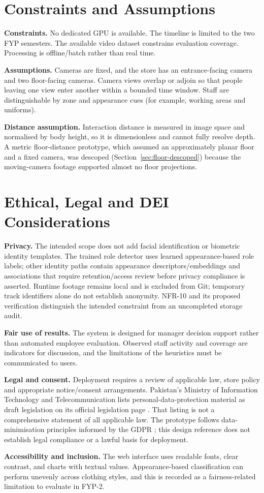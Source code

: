 \section{Constraints and Assumptions}
\textbf{Constraints.} No dedicated GPU is available. The timeline is limited to the two FYP semesters. The available video dataset constrains evaluation coverage. Processing is offline/batch rather than real time.

\textbf{Assumptions.} Cameras are fixed, and the store has an entrance-facing camera and two floor-facing cameras. Camera views overlap or adjoin so that people leaving one view enter another within a bounded time window. Staff are distinguishable by zone and appearance cues (for example, working areas and uniforms).

\textbf{Distance assumption.} Interaction distance is measured in image space and normalised by body height, so it is dimensionless and cannot fully resolve depth. A metric floor-distance prototype, which assumed an approximately planar floor and a fixed camera, was descoped (Section~\ref{sec:floor-descoped}) because the moving-camera footage supported almost no floor projections.

\section{Ethical, Legal and DEI Considerations}
\textbf{Privacy.} The intended scope does not add facial identification or biometric identity templates. The trained role detector uses learned appearance-based role labels; other identity paths contain appearance descriptors/embeddings and associations that require retention/access review before privacy compliance is asserted. Runtime footage remains local and is excluded from Git; temporary track identifiers alone do not establish anonymity. NFR-10 and its proposed verification distinguish the intended constraint from an uncompleted storage audit.

\textbf{Fair use of results.} The system is designed for manager decision support rather than automated employee evaluation. Observed staff activity and coverage are indicators for discussion, and the limitations of the heuristics must be communicated to users.

\textbf{Legal and consent.} Deployment requires a review of applicable law, store policy and appropriate notice/consent arrangements. Pakistan's Ministry of Information Technology and Telecommunication lists personal-data-protection material as draft legislation on its official legislation page \cite{pakistanMoittLegislation}. That listing is not a comprehensive statement of all applicable law. The prototype follows data-minimisation principles informed by the GDPR \cite{gdpr2016}; this design reference does not establish legal compliance or a lawful basis for deployment.

\textbf{Accessibility and inclusion.} The web interface uses readable fonts, clear contrast, and charts with textual values. Appearance-based classification can perform unevenly across clothing styles, and this is recorded as a fairness-related limitation to evaluate in FYP-2.
